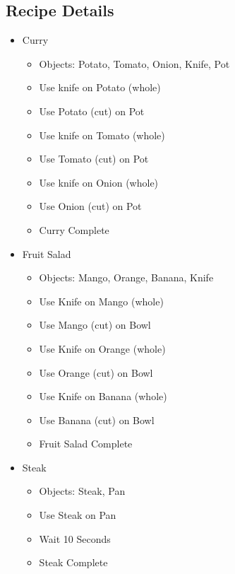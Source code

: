 \documentclass[11pt]{article}
\begin{document}
\subsection*{Recipe Details}
\label{sec:org2182047}

\begin{itemize}
\item Curry
\begin{itemize}
\item Objects: Potato, Tomato, Onion, Knife, Pot
\item Use knife on Potato (whole)
\item Use Potato (cut) on Pot
\item Use knife on Tomato (whole)
\item Use Tomato (cut) on Pot
\item Use knife on Onion (whole)
\item Use Onion (cut) on Pot
\item Curry Complete
\end{itemize}

\item Fruit Salad
\begin{itemize}
\item Objects: Mango, Orange, Banana, Knife
\item Use Knife on Mango (whole)
\item Use Mango (cut) on Bowl
\item Use Knife on Orange (whole)
\item Use Orange (cut) on Bowl
\item Use Knife on Banana (whole)
\item Use Banana (cut) on Bowl
\item Fruit Salad Complete
\end{itemize}

\item Steak
\begin{itemize}
\item Objects: Steak, Pan
\item Use Steak on Pan
\item Wait 10 Seconds
\item Steak Complete
\end{itemize}
\end{itemize}
\end{document}
